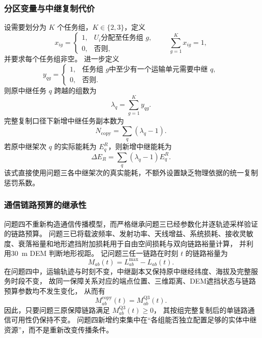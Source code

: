 \subsubsection{分区变量与中继复制代价}

设需要划分为 $K$ 个任务组，$K\in\{2,3\}$，定义
\begin{equation}
	x_{ig}=\begin{cases}
		1,&U_i\text{分配至任务组 }g,\\
		0,&\text{否则},
	\end{cases}
	\qquad
	\sum_{g=1}^{K}x_{ig}=1,
	\label{eq:q4-x}
\end{equation}
并要求每个任务组非空。
进一步定义
\begin{equation}
	y_{qg}=\begin{cases}
		1,&\text{任务组 }g\text{中至少有一个运输单元需要中继 }q,\\
		0,&\text{否则}.
	\end{cases}
	\label{eq:q4-y}
\end{equation}
则原中继任务 $q$ 跨越的组数为
\begin{equation}
	\lambda_q=\sum_{g=1}^{K}y_{qg}.
	\label{eq:q4-lambda}
\end{equation}
完整复制口径下新增中继任务副本数为
\begin{equation}
	\boxed{
		N_{\mathrm{copy}}=\sum_q(\lambda_q-1)
	}.
	\label{eq:q4-copy}
\end{equation}
若原中继架次 $q$ 的实际能耗为 $E_q^R$，则新增中继能耗为
\begin{equation}
	\boxed{
		\Delta E_R=\sum_q(\lambda_q-1)E_q^R
	}.
	\label{eq:q4-extra-energy}
\end{equation}
该式直接使用问题三各中继架次的真实能耗，不额外设置缺乏物理依据的统一复制惩罚系数。

\subsubsection{通信链路预算的继承性}

问题四不重新构造通信传播模型，而严格继承问题三已经参数化并逐轨迹采样验证的链路预算。
问题三已将载波频率、发射功率、天线增益、系统损耗、接收灵敏度、衰落裕量和地形遮挡附加损耗用于自由空间损耗与双向链路裕量计算，
并利用30~m DEM 判断地形视距。
记问题三任一链路在时刻 $t$ 的链路裕量为
\begin{equation}
	M_{ab}(t)=L_{ab}^{\max}-L_{ab}(t).
	\label{eq:q4-margin-inherit}
\end{equation}
在问题四中，运输轨迹与时刻不变，中继副本又保持原中继经纬度、海拔及完整服务时段不变，
故同一保障关系对应的端点位置、三维距离、DEM遮挡状态与链路预算参数均不发生变化，
从而有
\begin{equation}
	M_{ab}^{\mathrm{copy}}(t)=M_{ab}^{\mathrm{Q3}}(t).
	\label{eq:q4-margin-equal}
\end{equation}
因此，只要问题三原保障链路满足 $M_{ab}^{\mathrm{Q3}}(t)\ge0$，
其按组完整复制后的单链路通信可用性仍保持不变。
问题四新增约束集中在“各组能否独立配置足够的实体中继资源”，而不是重新改变传播条件。

